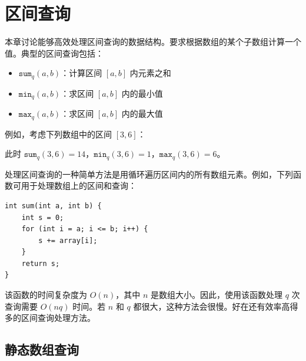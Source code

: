 \chapter{区间查询}


本章讨论能够高效处理区间查询的数据结构。要求根据数组的某个子数组计算一个值。典型的区间查询包括：
\begin{itemize}
\item $\texttt{sum}_q(a,b)$：计算区间 $[a,b]$ 内元素之和
\item $\texttt{min}_q(a,b)$：求区间 $[a,b]$ 内的最小值
\item $\texttt{max}_q(a,b)$：求区间 $[a,b]$ 内的最大值
\end{itemize}

例如，考虑下列数组中的区间 $[3,6]$：
\begin{center}
\end{center}
此时 $\texttt{sum}_q(3,6)=14$，$\texttt{min}_q(3,6)=1$，$\texttt{max}_q(3,6)=6$。

处理区间查询的一种简单方法是用循环遍历区间内的所有数组元素。例如，下列函数可用于处理数组上的区间和查询：

\begin{lstlisting}
int sum(int a, int b) {
    int s = 0;
    for (int i = a; i <= b; i++) {
        s += array[i];
    }
    return s;
}
\end{lstlisting}

该函数的时间复杂度为 $O(n)$，其中 $n$ 是数组大小。因此，使用该函数处理 $q$ 次查询需要 $O(nq)$ 时间。若 $n$ 和 $q$ 都很大，这种方法会很慢。好在还有效率高得多的区间查询处理方法。

\section{静态数组查询}

